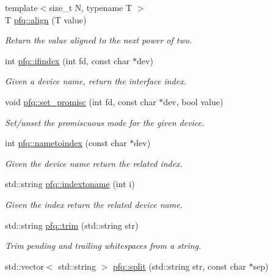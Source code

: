 \begin{DoxyCompactItemize}
\item 
{\footnotesize template$<$size\+\_\+t N, typename T $>$ }\\T \hyperlink{namespacepfq_a9db75e7163c5f764248401d10a2a3f9b}{pfq\+::align} (T value)
\begin{DoxyCompactList}\small\item\em Return the value aligned to the next power of two. \end{DoxyCompactList}\item 
int \hyperlink{namespacepfq_a251ac5cc269aa123009754edf62ab8b4}{pfq\+::ifindex} (int fd, const char $\ast$dev)
\begin{DoxyCompactList}\small\item\em Given a device name, return the interface index. \end{DoxyCompactList}\item 
void \hyperlink{namespacepfq_a62b9f1831dc714353f6edcb66a4fad4d}{pfq\+::set\+\_\+promisc} (int fd, const char $\ast$dev, bool value)
\begin{DoxyCompactList}\small\item\em Set/unset the promiscuous mode for the given device. \end{DoxyCompactList}\item 
int \hyperlink{namespacepfq_ad66073cd0c09437436747515fcab1e43}{pfq\+::nametoindex} (const char $\ast$dev)
\begin{DoxyCompactList}\small\item\em Given the device name return the related index. \end{DoxyCompactList}\item 
std\+::string \hyperlink{namespacepfq_a092fadb4224e60ee17efb0553d982438}{pfq\+::indextoname} (int i)
\begin{DoxyCompactList}\small\item\em Given the index return the related device name. \end{DoxyCompactList}\item 
std\+::string \hyperlink{namespacepfq_a02a1861a64cc518394d3cc4361799c9f}{pfq\+::trim} (std\+::string str)
\begin{DoxyCompactList}\small\item\em Trim pending and trailing whitespaces from a string. \end{DoxyCompactList}\item 
std\+::vector$<$ std\+::string $>$ \hyperlink{namespacepfq_a0c3aeb61dfd544cb08cb240202caf213}{pfq\+::split} (std\+::string str, const char $\ast$sep)

\end{DoxyCompactItemize}
